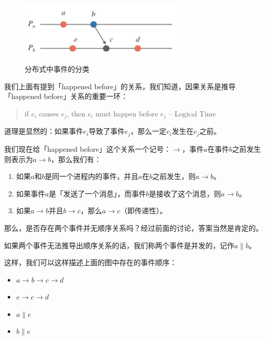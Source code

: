 \documentclass[cn,11pt,chinese]{elegantbook}
\begin{document}
\begin{figure}
    \centering
    \includegraphics[width=0.7\textwidth]{images/appendix-a-09.jpeg}
    \caption{分布式中事件的分类}
\end{figure}

我们上面有提到「happened before」的关系，我们知道，因果关系是推导「happened before」关系的重要一环：

\begin{quotation}
    if $e_i$ causes $e_j$, then $e_i$ must happen before $e_j$ – Logical Time
\end{quotation}

道理是显然的：如果事件$e_i$导致了事件$e_j$，那么一定$e_i$发生在$e_j$之前。

我们现在给「happened before」这个关系一个记号：$\rightarrow$，事件$a$在事件$b$之前发生则表示为$a \rightarrow b$，那么我们有：

\begin{enumerate}
    \item 如果$a$和$b$是同一个进程内的事件，并且$a$在$b$之前发生，则$a \rightarrow b$。
    \item 如果事件$a$是「发送了一个消息」，而事件$b$是接收了这个消息，则$a \rightarrow b$。
    \item 如果$a \rightarrow b$并且$b \rightarrow c$，那么$a \rightarrow c$（即传递性）。
\end{enumerate}

那么，是否存在两个事件并无顺序关系吗？经过前面的讨论，答案当然是肯定的。

如果两个事件无法推导出顺序关系的话，我们称两个事件是并发的，记作$a \parallel b$。

这样，我们可以这样描述上面的图中存在的事件顺序：

\begin{itemize}
    \item $a \rightarrow b \rightarrow c \rightarrow d$
    \item $e \rightarrow c \rightarrow d$
    \item $a \parallel e$
    \item $b \parallel e$
\end{itemize}
\end{document}
